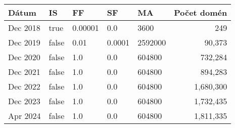 \begin{tabular}{lllllr}
\toprule
Dátum & IS & FF & SF & MA & Počet domén \\
\midrule
Dec 2018 & true & 0.00001 & 0.0 & 3600 & 249 \\
Dec 2019 & false & 0.01 & 0.0001 & 2592000 & 90,373 \\
Dec 2020 & false & 1.0 & 0.0 & 604800 & 732,284 \\
Dec 2021 & false & 1.0 & 0.0 & 604800 & 894,283 \\
Dec 2022 & false & 1.0 & 0.0 & 604800 & 1,680,300 \\
Dec 2023 & false & 1.0 & 0.0 & 604800 & 1,732,435 \\
Apr 2024 & false & 1.0 & 0.0 & 604800 & 1,811,335 \\
\bottomrule
\end{tabular}
